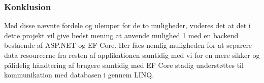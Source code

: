 \subsubsection{Konklusion}

Med disse nævnte fordele og ulemper for de to muligheder, vuderes det at det i dette projekt vil give bedst mening at anvende mulighed 1 med en backend bestående af ASP.NET og EF Core. Her fåes nemlig muligheden for at separere data resourcerne fra resten af applikationen samtidig med vi for en mere sikker og pålidelig håndtering af brugere samtidig med EF Core stadig understøttes til kommunikation med databasen i gennem LINQ.\\



\newpage
